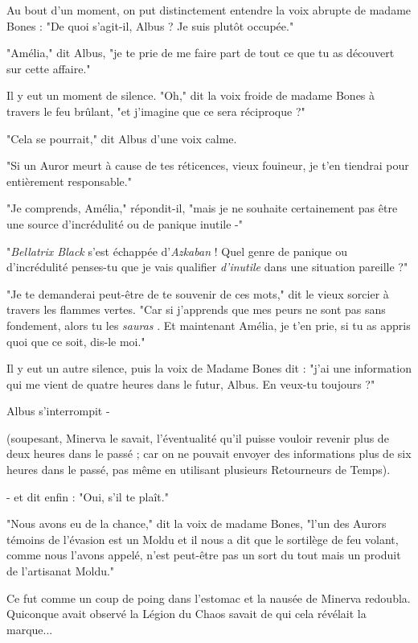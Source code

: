 Au bout d'un moment, on put distinctement entendre la voix abrupte de madame Bones : "De quoi s'agit-il, Albus ? Je suis plutôt occupée."

"Amélia," dit Albus, "je te prie de me faire part de tout ce que tu as découvert sur cette affaire."

Il y eut un moment de silence. "Oh," dit la voix froide de madame Bones à travers le feu brûlant, "et j'imagine que ce sera réciproque ?"

"Cela se pourrait," dit Albus d'une voix calme.

"Si un Auror meurt à cause de tes réticences, vieux fouineur, je t'en tiendrai pour entièrement responsable."

"Je comprends, Amélia," répondit-il, "mais je ne souhaite certainement pas être une source d'incrédulité ou de panique inutile -"

"\emph{Bellatrix Black}  s'est échappée d'\emph{Azkaban}  ! Quel genre de panique ou d'incrédulité penses-tu que je vais qualifier \emph{d'inutile}  dans une situation pareille ?"

"Je te demanderai peut-être de te souvenir de ces mots," dit le vieux sorcier à travers les flammes vertes. "Car si j'apprends que mes peurs ne sont pas sans fondement, alors tu les \emph{sauras} . Et maintenant Amélia, je t'en prie, si tu as appris quoi que ce soit, dis-le moi."

Il y eut un autre silence, puis la voix de Madame Bones dit : "j'ai une information qui me vient de quatre heures dans le futur, Albus. En veux-tu toujours ?"

Albus s'interrompit -

(soupesant, Minerva le savait, l'éventualité qu'il puisse vouloir revenir plus de deux heures dans le passé ; car on ne pouvait envoyer des informations plus de six heures dans le passé, pas même en utilisant plusieurs Retourneurs de Temps).

- et dit enfin : "Oui, s'il te plaît."

"Nous avons eu de la chance," dit la voix de madame Bones, "l'un des Aurors témoins de l'évasion est un Moldu et il nous a dit que le sortilège de feu volant, comme nous l'avons appelé, n'est peut-être pas un sort du tout mais un produit de l'artisanat Moldu."

Ce fut comme un coup de poing dans l'estomac et la nausée de Minerva redoubla. Quiconque avait observé la Légion du Chaos savait de qui cela révélait la marque...

